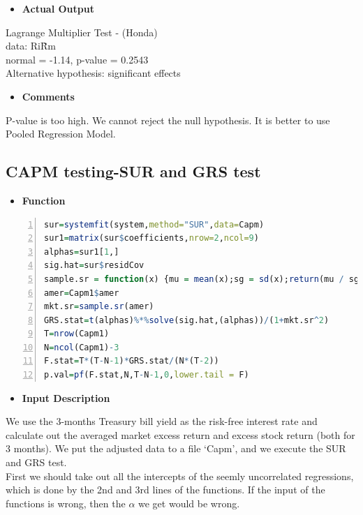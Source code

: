     \begin{itemize}
    \item \textbf{Actual Output}
    \end{itemize}
    Lagrange Multiplier Test - (Honda)\\
    data:  Ri\~Rm\\
    normal = -1.14, p-value = 0.2543\\
    Alternative hypothesis: significant effects\\


    \begin{itemize}
    \item \textbf{Comments}
    \end{itemize}
    P-value is too high. We cannot reject the null hypothesis. It is better to use Pooled Regression Model.\\

    \subsection{CAPM testing-SUR and GRS test}
    \begin{itemize}
    \item \textbf{Function}
    \end{itemize}
    \begin{lstlisting}[language=R,numbers=left, numberstyle=\normalsize]
sur=systemfit(system,method="SUR",data=Capm)
sur1=matrix(sur$coefficients,nrow=2,ncol=9)
alphas=sur1[1,]
sig.hat=sur$residCov
sample.sr = function(x) {mu = mean(x);sg = sd(x);return(mu / sg)}
amer=Capm1$amer
mkt.sr=sample.sr(amer)
GRS.stat=t(alphas)%*%solve(sig.hat,(alphas))/(1+mkt.sr^2)
T=nrow(Capm1)
N=ncol(Capm1)-3
F.stat=T*(T-N-1)*GRS.stat/(N*(T-2))
p.val=pf(F.stat,N,T-N-1,0,lower.tail = F)

    \end{lstlisting}
    \begin{itemize}
    \item \textbf{Input Description}
    \end{itemize}
    \noindent We use the 3-months Treasury bill yield as the risk-free interest rate and calculate out the averaged market excess return and excess stock return (both for 3 months). We put the adjusted data to a file `Capm', and we execute the SUR and GRS test.\\

    First we should take out all the intercepts of the seemly uncorrelated regressions, which is done by the 2nd and 3rd lines of the functions. If the input of the functions is wrong, then the $\alpha$ we get would be wrong.\\

